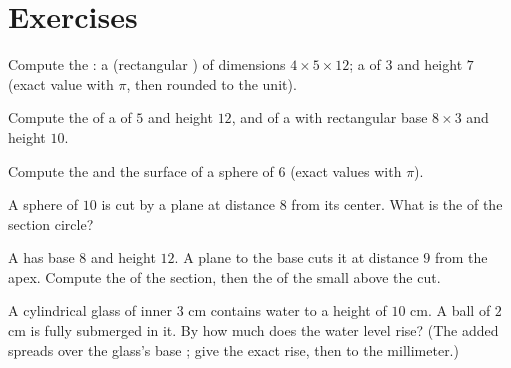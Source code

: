 \section{Exercises}

\begin{exercise}[$\star$]\label{exo:g9:solids:1}
Compute the : a  (rectangular ) of dimensions $4 \times 5
\times 12$; a  of  $3$ and height $7$ (exact value with
$\pi$, then rounded to the unit).
\end{exercise}

\begin{exercise}[$\star$]\label{exo:g9:solids:2}
Compute the  of a  of  $5$ and height $12$, and of a
 with rectangular base $8 \times 3$ and height $10$.
\end{exercise}

\begin{exercise}[$\star$]\label{exo:g9:solids:3}
Compute the  and the surface  of a sphere of  $6$ (exact
values with $\pi$).
\end{exercise}

\begin{exercise}[$\star$]\label{exo:g9:solids:4}
A sphere of  $10$ is cut by a plane at distance $8$ from its
center. What is the  of the section circle?
\end{exercise}

\begin{exercise}[$\star\star$]\label{exo:g9:solids:5}
A  has base  $8$ and height $12$. A plane  to the base
cuts it at distance $9$ from the apex. Compute the  of the
section, then the  of the small  above the cut.
\end{exercise}

\begin{exercise}[$\star\star$]\label{exo:g9:solids:6}
A cylindrical glass of inner  $3$ cm contains water to a height of
$10$ cm. A ball of  $2$ cm is fully submerged in it. By how much
does the water level rise? (The added  spreads over the glass's
base ; give the exact rise, then  to the millimeter.)
\end{exercise}

